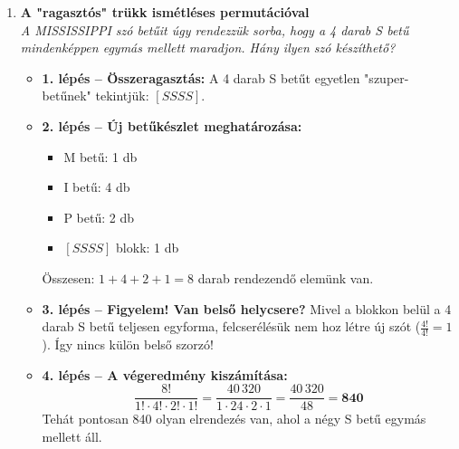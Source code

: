 \documentclass[11pt, a4paper]{article}
\begin{document}
\begin{enumerate}[label=\arabic*., leftmargin=*]
    \vspace{0.5cm}

    \item \textbf{A "ragasztós" trükk ismétléses permutációval}\\
    \textit{A MISSISSIPPI szó betűit úgy rendezzük sorba, hogy a 4 darab S betű mindenképpen egymás mellett maradjon. Hány ilyen szó készíthető?}
    \begin{itemize}
        \item \textbf{1. lépés – Összeragasztás:} A 4 darab S betűt egyetlen "szuper-betűnek" tekintjük: $[SSSS]$.
        \item \textbf{2. lépés – Új betűkészlet meghatározása:}
        \begin{itemize}
            \item M betű: 1 db
            \item I betű: 4 db
            \item P betű: 2 db
            \item $[SSSS]$ blokk: 1 db
        \end{itemize}
        Összesen: $1 + 4 + 2 + 1 = 8$ darab rendezendő elemünk van.
        \item \textbf{3. lépés – Figyelem! Van belső helycsere?}
        Mivel a blokkon belül a 4 darab S betű teljesen egyforma, felcserélésük nem hoz létre új szót ($\frac{4!}{4!} = 1$). Így nincs külön belső szorzó!
        \item \textbf{4. lépés – A végeredmény kiszámítása:}
        \[
        \frac{8!}{1! \cdot 4! \cdot 2! \cdot 1!} = \frac{40\,320}{1 \cdot 24 \cdot 2 \cdot 1} = \frac{40\,320}{48} = \mathbf{840}
        \]
        Tehát pontosan 840 olyan elrendezés van, ahol a négy S betű egymás mellett áll.
    \end{itemize}

    \begin{center}
    \end{center}
\end{enumerate}
\end{document}
